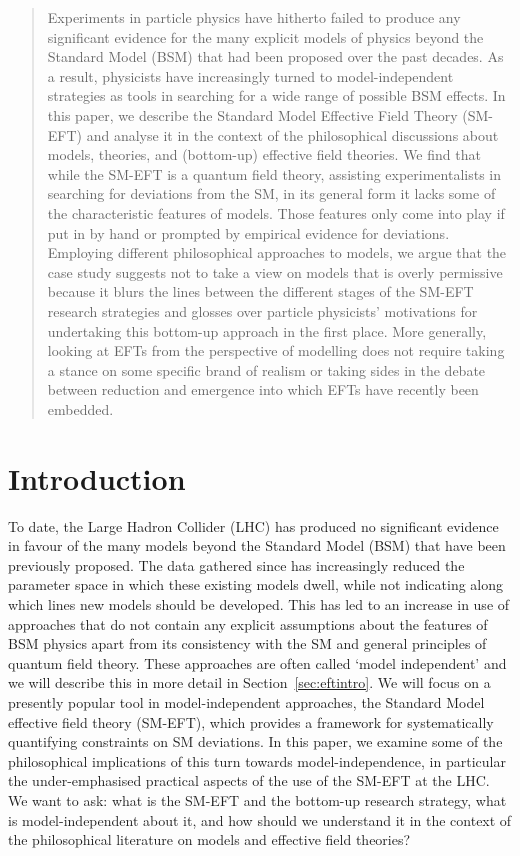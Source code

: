 
\begin{abstract}
Experiments in particle physics have hitherto failed to produce any significant evidence for the many explicit models of physics beyond the Standard Model (BSM) that had been proposed over the past decades. 
As a result, physicists have increasingly turned to model-independent strategies as tools in searching for a wide range of possible BSM effects.
In this paper, we describe the Standard Model Effective Field Theory (SM-EFT) and analyse it in the context of the philosophical discussions about models, theories, and (bottom-up) effective field theories.
We find that while the SM-EFT is a quantum field theory, assisting experimentalists in searching for deviations from the SM, in its general form it lacks some of the characteristic features of models. 
Those features only come into play if put in by hand or prompted by empirical evidence for deviations. 
Employing different philosophical approaches to models, we argue that the case study suggests not to take a view on models that is overly permissive because it blurs the lines between the different stages of the SM-EFT research strategies and glosses over particle physicists' motivations for undertaking this bottom-up approach in the first place. 
More generally, looking at EFTs from the perspective of modelling does not require taking a stance on some specific brand of realism or taking sides in the debate between reduction and emergence into which EFTs have recently been embedded.
\end{abstract}

\section{Introduction}

To date, the Large Hadron Collider (LHC) has produced no significant evidence in favour of the many models beyond the Standard Model (BSM) that have been previously proposed. 
The data gathered since has increasingly reduced the parameter space in which these existing models dwell, while not indicating along which lines new models should be developed.
This has led to an increase in use of approaches that do not contain any explicit assumptions about the features of BSM physics apart from its consistency with the SM and general principles of quantum field theory.
These approaches are often called `model independent' and we will describe this in more detail in Section~\ref{sec:eftintro}.
We will focus on a presently popular tool in model-independent approaches, the Standard Model effective field theory (SM-EFT), which provides a framework for systematically quantifying constraints on SM deviations.
In this paper, we examine some of the philosophical implications of this turn towards model-independence, in particular the under-emphasised practical aspects of the use of the SM-EFT at the LHC.
We want to ask: what is the SM-EFT and the bottom-up research strategy, what is model-independent about it, and how should we understand it in the context of the philosophical literature on models and effective field theories?

